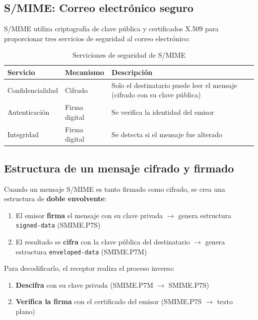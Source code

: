\subsection{S/MIME: Correo electrónico seguro}

S/MIME utiliza criptografía de clave pública y certificados X.509 para proporcionar tres servicios de seguridad al correo electrónico:

\begin{table}[H]
    \centering
    \caption{Serviciones de seguridad de S/MIME}
    \begin{tabularx}{\textwidth}{l|l|X}
        \toprule
        \textbf{Servicio} & \textbf{Mecanismo} & \textbf{Descripción} \\
        \midrule
        Confidencialidad & Cifrado & Solo el destinatario puede leer el mensaje (cifrado con su clave pública) \\
        Autenticación & Firma digital & Se verifica la identidad del emisor \\
        Integridad & Firma digital & Se detecta si el mensaje fue alterado \\
        \bottomrule
    \end{tabularx}
\end{table}

\subsection{Estructura de un mensaje cifrado y firmado}

Cuando un mensaje S/MIME es tanto firmado como cifrado, se crea una estructura de \textbf{doble envolvente}:

\begin{enumerate}
    \item El emisor \textbf{firma} el mensaje con su clave privada $\rightarrow$ genera estructura \texttt{signed-data} (SMIME.P7S)
    \item El resultado se \textbf{cifra} con la clave pública del destinatario $\rightarrow$ genera estructura \texttt{enveloped-data} (SMIME.P7M)
\end{enumerate}

Para decodificarlo, el receptor realiza el proceso inverso:

\begin{enumerate}
    \item \textbf{Descifra} con su clave privada (SMIME.P7M $\rightarrow$ SMIME.P7S)
    \item \textbf{Verifica la firma} con el certificado del emisor (SMIME.P7S $\rightarrow$ texto plano)
\end{enumerate}

